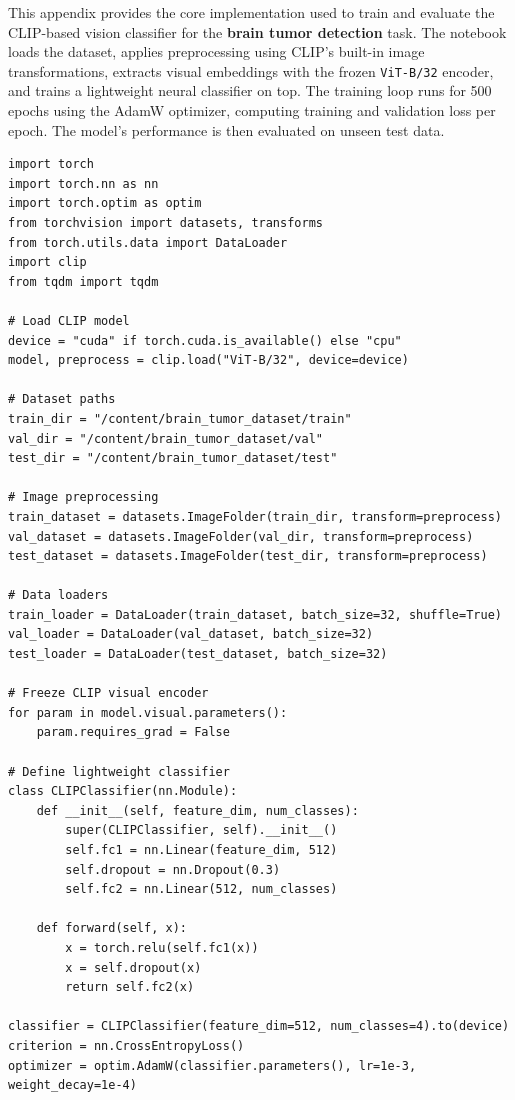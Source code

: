 \documentclass[12pt]{article}
\begin{document}
This appendix provides the core implementation used to train and evaluate the CLIP-based vision classifier for the \textbf{brain tumor detection} task.  
The notebook loads the dataset, applies preprocessing using CLIP’s built-in image transformations, extracts visual embeddings with the frozen \texttt{ViT-B/32} encoder, and trains a lightweight neural classifier on top.  
The training loop runs for 500 epochs using the AdamW optimizer, computing training and validation loss per epoch.  
The model’s performance is then evaluated on unseen test data.

\vspace{1em}

\begin{lstlisting}[style=pythonstyle, caption={Brain Tumor Detection Model (CLIP ViT-B/32)}]
import torch
import torch.nn as nn
import torch.optim as optim
from torchvision import datasets, transforms
from torch.utils.data import DataLoader
import clip
from tqdm import tqdm

# Load CLIP model
device = "cuda" if torch.cuda.is_available() else "cpu"
model, preprocess = clip.load("ViT-B/32", device=device)

# Dataset paths
train_dir = "/content/brain_tumor_dataset/train"
val_dir = "/content/brain_tumor_dataset/val"
test_dir = "/content/brain_tumor_dataset/test"

# Image preprocessing
train_dataset = datasets.ImageFolder(train_dir, transform=preprocess)
val_dataset = datasets.ImageFolder(val_dir, transform=preprocess)
test_dataset = datasets.ImageFolder(test_dir, transform=preprocess)

# Data loaders
train_loader = DataLoader(train_dataset, batch_size=32, shuffle=True)
val_loader = DataLoader(val_dataset, batch_size=32)
test_loader = DataLoader(test_dataset, batch_size=32)

# Freeze CLIP visual encoder
for param in model.visual.parameters():
    param.requires_grad = False

# Define lightweight classifier
class CLIPClassifier(nn.Module):
    def __init__(self, feature_dim, num_classes):
        super(CLIPClassifier, self).__init__()
        self.fc1 = nn.Linear(feature_dim, 512)
        self.dropout = nn.Dropout(0.3)
        self.fc2 = nn.Linear(512, num_classes)

    def forward(self, x):
        x = torch.relu(self.fc1(x))
        x = self.dropout(x)
        return self.fc2(x)

classifier = CLIPClassifier(feature_dim=512, num_classes=4).to(device)
criterion = nn.CrossEntropyLoss()
optimizer = optim.AdamW(classifier.parameters(), lr=1e-3, weight_decay=1e-4)


\end{lstlisting}
\end{document}
